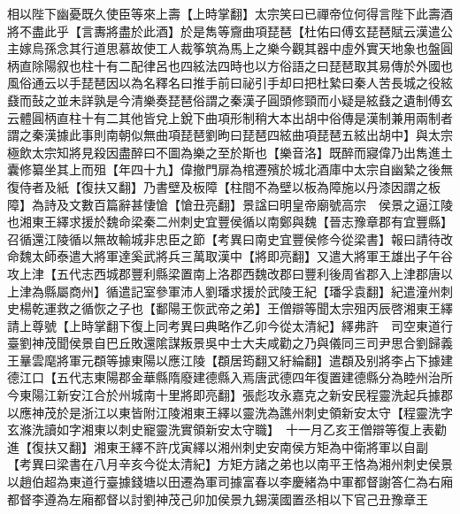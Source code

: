 相以陛下幽憂既久使臣等來上壽【上時掌翻】太宗笑曰已禪帝位何得言陛下此壽酒將不盡此乎【言夀將盡於此酒】於是雋等齎曲項琵琶【杜佑曰傅玄琵琶賦云漢遣公主嫁烏孫念其行道思慕故使工人裁筝筑為馬上之樂今觀其器中虛外實天地象也盤圓柄直除陽叙也柱十有二配律呂也四絃法四時也以方俗語之曰琵琶取其易傳於外國也風俗通云以手琵琶因以為名釋名曰推手前曰祕引手却曰把杜縶曰秦人苦長城之役絃鼗而鼔之並未詳孰是今清樂奏琵琶俗謂之秦漢子圓頭修頸而小疑是絃鼗之遺制傅玄云體圓柄直柱十有二其他皆兌上銳下曲項形制稍大本出胡中俗傳是漢制兼用兩制者謂之秦漢據此事則南朝似無曲項琵琶劉昫曰琵琶四絃曲項琵琶五絃出胡中】與太宗極飲太宗知將見殺因盡醉曰不圖為樂之至於斯也【樂音洛】既醉而寢偉乃出雋進土囊修纂坐其上而殂【年四十九】偉撤門扉為棺遷殯於城北酒庫中太宗自幽縶之後無復侍者及紙【復扶又翻】乃書壁及板障【柱間不為壁以板為障施以丹漆因謂之板障】為詩及文數百篇辭甚悽愴【愴丑亮翻】景諡曰明皇帝廟號高宗　侯景之逼江陵也湘東王繹求援於魏命梁秦二州刺史宜豐侯循以南鄭與魏【晉志豫章郡有宜豐縣】召循還江陵循以無故輸城非忠臣之節【考異曰南史宜豐侯修今從梁書】報曰請待改命魏太師泰遣大將軍達奚武將兵三萬取漢中【將即亮翻】又遣大將軍王雄出子午谷攻上津【五代志西城郡豐利縣梁置南上洛郡西魏改郡曰豐利後周省郡入上津郡唐以上津為縣屬商州】循遣記室參軍沛人劉璠求援於武陵王紀【璠孚袁翻】紀遣潼州刺史楊乾運救之循恢之子也【鄱陽王恢武帝之弟】王僧辯等聞太宗殂丙辰啓湘東王繹請上尊號【上時掌翻下復上同考異曰典略作乙卯今從太清紀】繹弗許　司空東道行臺劉神茂聞侯景自巴丘敗還隂謀叛景吳中士大夫咸勸之乃與儀同三司尹思合劉歸義王曅雲麾將軍元頵等據東陽以應江陵【頵居筠翻又紆綸翻】遣頵及别將李占下據建德江口【五代志東陽郡金華縣隋廢建德縣入焉唐武德四年復置建德縣分為睦州治所今東陽江新安江合於州城南十里將即亮翻】張彪攻永嘉克之新安民程靈洗起兵據郡以應神茂於是浙江以東皆附江陵湘東王繹以靈洗為譙州刺史領新安太守【程靈洗字玄滌洗讀如字湘東以刺史寵靈洗實領新安太守職】　十一月乙亥王僧辯等復上表勸進【復扶又翻】湘東王繹不許戊寅繹以湘州刺史安南侯方矩為中衛將軍以自副　【考異曰梁書在八月辛亥今從太清紀】方矩方諸之弟也以南平王恪為湘州刺史侯景以趙伯超為東道行臺據錢塘以田遷為軍司據富春以李慶緒為中軍都督謝答仁為右廂都督李遵為左廂都督以討劉神茂己卯加侯景九錫漢國置丞相以下官己丑豫章王

